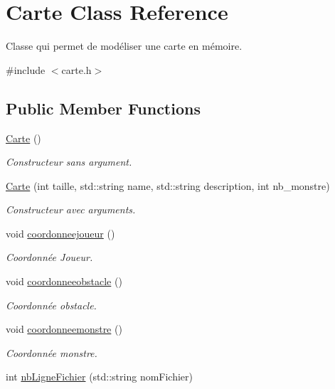 \hypertarget{class_carte}{}\section{Carte Class Reference}
\label{class_carte}


Classe qui permet de modéliser une carte en mémoire.  




{\ttfamily \#include $<$carte.\+h$>$}

\subsection*{Public Member Functions}
\begin{DoxyCompactItemize}
\item 
\hyperlink{class_carte_a06daaca86c31c80f8308f4a81d46dc9b}{Carte} ()
\begin{DoxyCompactList}\small\item\em Constructeur sans argument. \end{DoxyCompactList}\item 
\hyperlink{class_carte_a9caa77a82f34e01b04d18bce6cce8587}{Carte} (int taille, std\+::string name, std\+::string description, int nb\+\_\+monstre)
\begin{DoxyCompactList}\small\item\em Constructeur avec arguments. \end{DoxyCompactList}\item 
void \hyperlink{class_carte_ae11b9253ce5aa727b6c49320f92e0668}{coordonneejoueur} ()
\begin{DoxyCompactList}\small\item\em Coordonnée Joueur. \end{DoxyCompactList}\item 
void \hyperlink{class_carte_a2a0ac8476d52a07b9cbcec0507df840d}{coordonneeobstacle} ()
\begin{DoxyCompactList}\small\item\em Coordonnée obstacle. \end{DoxyCompactList}\item 
void \hyperlink{class_carte_ad3f5fbdd5c6a248e92bad65680493ccd}{coordonneemonstre} ()
\begin{DoxyCompactList}\small\item\em Coordonnée monstre. \end{DoxyCompactList}\item 
int \hyperlink{class_carte_a2cd533b7b1a04298a19e7eef566bc7f1}{nb\+Ligne\+Fichier} (std\+::string nom\+Fichier)

\end{DoxyCompactItemize}
